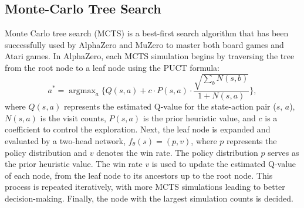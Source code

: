 \subsection{Monte-Carlo Tree Search}
\label{subsec:bg_mcts}
Monte Carlo tree search (MCTS) \citep{coulom_efficient_2007,kocsis_bandit_2006} is a best-first search algorithm that has been successfully used by AlphaZero \citep{silver_general_2018} and MuZero \citep{schrittwieser_mastering_2020} to master both board games and Atari games.
In AlphaZero, each MCTS simulation begins by traversing the tree from the root node to a leaf node using the PUCT \citep{rosin_multiarmed_2011} formula:
\begin{equation}
\label{equ:PUCT}
    {a^*} = \mathop{\arg\max}_{a} \Bigg\{Q(s,a)+c\cdot P(s,a)\cdot\frac {\sqrt{\sum_{b}{N(s,b)}}}{1+N(s,a)}\Bigg\},
\end{equation}
where $Q(s,a)$ represents the estimated Q-value for the state-action pair ($s$, $a$), $N(s,a)$ is the visit counts, $P(s,a)$ is the prior heuristic value, and $c$ is a coefficient to control the exploration.
Next, the leaf node is expanded and evaluated by a two-head network, $f_\theta(s)=(p,v)$, where $p$ represents the policy distribution and $v$ denotes the win rate.
The policy distribution $p$ serves as the prior heuristic value.
The win rate $v$ is used to update the estimated Q-value of each node, from the leaf node to its ancestors up to the root node.
This process is repeated iteratively, with more MCTS simulations leading to better decision-making.
Finally, the node with the largest simulation counts is decided.


